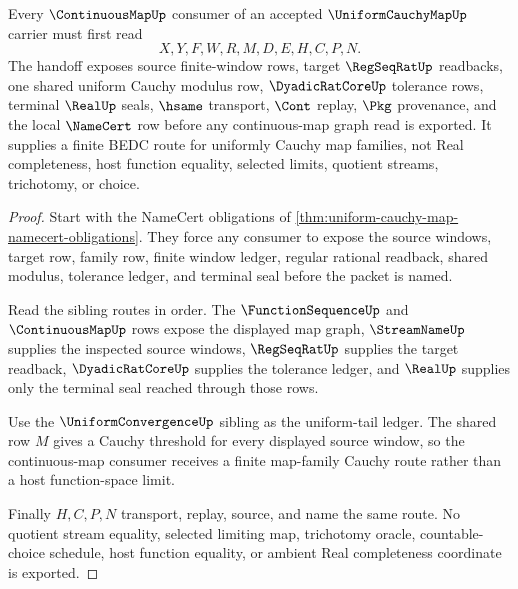 \begin{theorem}
\label{thm:uniform-cauchy-map-continuousmap-handoff}
Every $\ContinuousMapUp$ consumer of an accepted $\UniformCauchyMapUp$ carrier must first read
$$
X,Y,F,W,R,M,D,E,H,C,P,N .
$$
The handoff exposes source finite-window rows, target $\RegSeqRatUp$ readbacks, one shared uniform Cauchy modulus row, $\DyadicRatCoreUp$ tolerance rows, terminal $\RealUp$ seals, $\hsame$ transport, $\Cont$ replay, $\Pkg$ provenance, and the local $\NameCert$ row before any continuous-map graph read is exported. It supplies a finite BEDC route for uniformly Cauchy map families, not Real completeness, host function equality, selected limits, quotient streams, trichotomy, or choice.
\end{theorem}
\begin{proof}
Start with the NameCert obligations of \autoref{thm:uniform-cauchy-map-namecert-obligations}. They force any consumer to expose the source windows, target row, family row, finite window ledger, regular rational readback, shared modulus, tolerance ledger, and terminal seal before the packet is named.

Read the sibling routes in order. The $\FunctionSequenceUp$ and $\ContinuousMapUp$ rows expose the displayed map graph, $\StreamNameUp$ supplies the inspected source windows, $\RegSeqRatUp$ supplies the target readback, $\DyadicRatCoreUp$ supplies the tolerance ledger, and $\RealUp$ supplies only the terminal seal reached through those rows.

Use the $\UniformConvergenceUp$ sibling as the uniform-tail ledger. The shared row $M$ gives a Cauchy threshold for every displayed source window, so the continuous-map consumer receives a finite map-family Cauchy route rather than a host function-space limit.

Finally $H,C,P,N$ transport, replay, source, and name the same route. No quotient stream equality, selected limiting map, trichotomy oracle, countable-choice schedule, host function equality, or ambient Real completeness coordinate is exported.
\end{proof}




